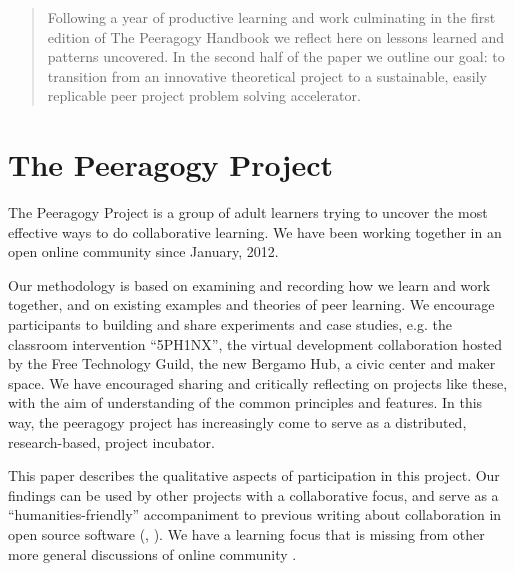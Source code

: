 \documentclass{acm_proc_article-sp}
\begin{document}


\maketitle
\begin{abstract}

Following a year of productive learning and work culminating in the first edition of The Peeragogy Handbook we reflect here on lessons learned and patterns uncovered. In the second half of the paper we outline our goal: to transition from an innovative theoretical project to a sustainable, easily replicable peer project problem solving accelerator.

\end{abstract}



\section{The Peeragogy Project}

The Peeragogy Project is a group of adult learners trying to uncover
the most effective ways to do collaborative learning.  We have been
working together in an open online community since January, 2012.  

Our methodology is based on examining and recording how we learn and
work together, and on existing examples and theories of peer learning.
We encourage participants to building and share experiments and case
studies, e.g. the classroom intervention ``5PH1NX'', the virtual
development collaboration hosted by the Free Technology Guild, the new
Bergamo Hub, a civic center and maker space.
We have encouraged sharing and critically reflecting on projects like these, with the aim of understanding of the common principles and features.  In this way, the peeragogy project has increasingly come to serve as a distributed, research-based, project incubator.

This paper describes the qualitative aspects of participation in this
project.  Our findings can be used by other projects with a
collaborative focus, and serve as a ``humanities-friendly'' accompaniment to
previous writing about collaboration in open source software
(\cite{OpenAdvice}, \cite{crowstonXdefiningX2003}).  We have a learning focus that is missing from other more general discussions of online community \cite{bacon2012art}.
\end{document}
